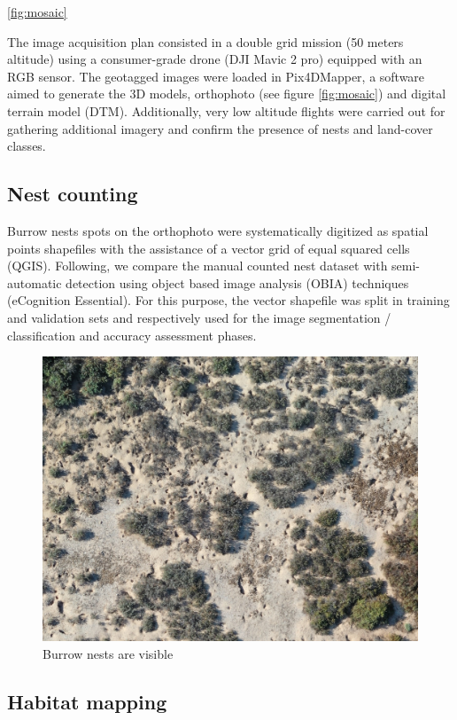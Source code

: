 \documentclass[12pt]{article}
\begin{document}
\ref{fig:mosaic}


The image acquisition plan consisted in a double grid mission (50 meters altitude) using a consumer-grade drone (DJI Mavic 2 pro) equipped with an RGB sensor. The geotagged images were loaded in Pix4DMapper, a software aimed to generate the 3D models, orthophoto (see figure \ref{fig:mosaic}) and digital terrain model (DTM). Additionally, very low altitude flights were carried out for gathering additional imagery and confirm the presence of nests and  land-cover classes.

\subsection{Nest counting}

Burrow nests spots on the orthophoto were systematically digitized as spatial points shapefiles with the assistance of a  vector grid of equal squared cells (QGIS). Following, we compare the manual counted nest dataset with semi-automatic detection using object based image analysis (OBIA) techniques (eCognition Essential). For this purpose, the vector shapefile was split in training and validation sets and respectively used for the image segmentation / classification and accuracy assessment phases.

\begin{figure}[H]
	\caption{Burrow nests are visible}
	\centering
	\includegraphics[width=1\textwidth]{clipped_birds_mosaic}
\end{figure}



\subsection{Habitat mapping}
\end{document}
